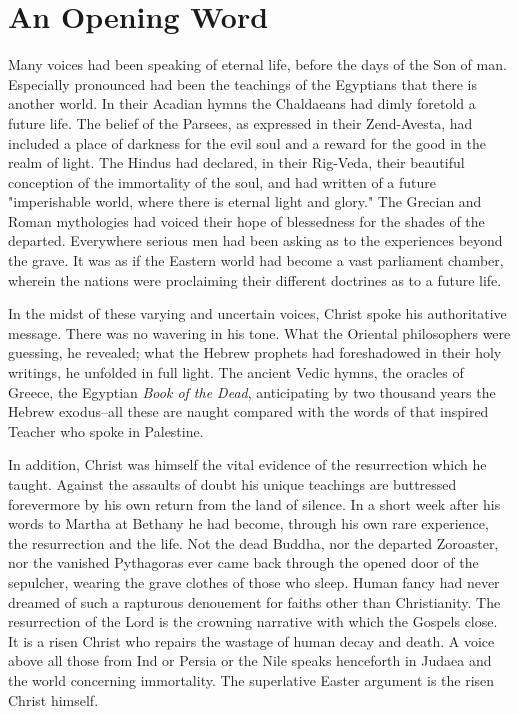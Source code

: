 \chapter*{An Opening Word}
Many voices had been speaking of eternal life, before the days of
the Son of man.  Especially pronounced had been the teachings of
the Egyptians that there is another world.   In their Acadian hymns
the Chaldaeans had dimly foretold a future life.  The belief of the
Parsees, as expressed in their Zend-Avesta, had included a place of
darkness for the evil soul and a reward for the good in the realm
of light.  The Hindus had declared, in their Rig-Veda, their
beautiful conception of the immortality of the soul, and had
written of a future "imperishable world, where there is eternal
light and glory."  The Grecian and Roman mythologies had voiced
their hope of blessedness for the shades of the departed.
Everywhere serious men had been asking as to the experiences beyond
the grave.  It was as if the Eastern world had become a vast
parliament chamber, wherein the nations were proclaiming their
different doctrines as to a future life.

In the midst of these varying and uncertain voices, Christ spoke
his authoritative message.  There was no wavering in his tone.
What the Oriental philosophers were guessing, he revealed; what the
Hebrew prophets had foreshadowed in their holy writings, he
unfolded in full light.  The ancient Vedic hymns, the oracles of
Greece, the Egyptian \textit{Book of the Dead}, anticipating by two
thousand years the Hebrew exodus--all these are naught compared
with the words of that inspired Teacher who spoke in Palestine.

In addition, Christ was himself the vital evidence of the
resurrection which he taught.  Against the assaults of doubt his
unique teachings are buttressed forevermore by his own return from
the land of silence.  In a short week after his words to Martha at
Bethany he had become, through his own rare experience, the
resurrection and the life.  Not the dead Buddha, nor the departed
Zoroaster, nor the vanished  Pythagoras  ever came back through the
opened door of the sepulcher, wearing the grave clothes of those
who sleep.  Human fancy had never dreamed of such a rapturous
denouement for faiths other than Christianity.  The resurrection of
the Lord is the crowning narrative with which the Gospels close.
It is a risen Christ who repairs the wastage of human decay and
death.  A voice above all those from Ind or Persia or the Nile
speaks henceforth in Judaea and the world concerning immortality.
The superlative Easter argument is the risen Christ himself.
